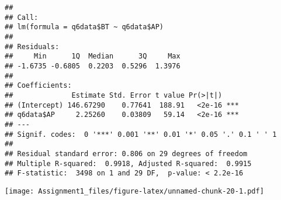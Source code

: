 \documentclass[
]{article}
\newenvironment{Shaded}{\begin{snugshade}}{\end{snugshade}}
\newcommand{\AttributeTok}[1]{\textcolor[rgb]{0.13,0.29,0.53}{#1}}
\newcommand{\CommentTok}[1]{\textcolor[rgb]{0.56,0.35,0.01}{\textit{#1}}}
\newcommand{\FunctionTok}[1]{\textcolor[rgb]{0.13,0.29,0.53}{\textbf{#1}}}
\newcommand{\NormalTok}[1]{#1}
\newcommand{\SpecialCharTok}[1]{\textcolor[rgb]{0.81,0.36,0.00}{\textbf{#1}}}
\newcommand{\StringTok}[1]{\textcolor[rgb]{0.31,0.60,0.02}{#1}}
\begin{document}
\begin{verbatim}
## 
## Call:
## lm(formula = q6data$BT ~ q6data$AP)
## 
## Residuals:
##     Min      1Q  Median      3Q     Max 
## -1.6735 -0.6805  0.2203  0.5296  1.3976 
## 
## Coefficients:
##              Estimate Std. Error t value Pr(>|t|)    
## (Intercept) 146.67290    0.77641  188.91   <2e-16 ***
## q6data$AP     2.25260    0.03809   59.14   <2e-16 ***
## ---
## Signif. codes:  0 '***' 0.001 '**' 0.01 '*' 0.05 '.' 0.1 ' ' 1
## 
## Residual standard error: 0.806 on 29 degrees of freedom
## Multiple R-squared:  0.9918, Adjusted R-squared:  0.9915 
## F-statistic:  3498 on 1 and 29 DF,  p-value: < 2.2e-16
\end{verbatim}

\begin{Shaded}
\end{Shaded}

\texttt{[image: Assignment1\_files/figure-latex/unnamed-chunk-20-1.pdf]}
\end{document}
